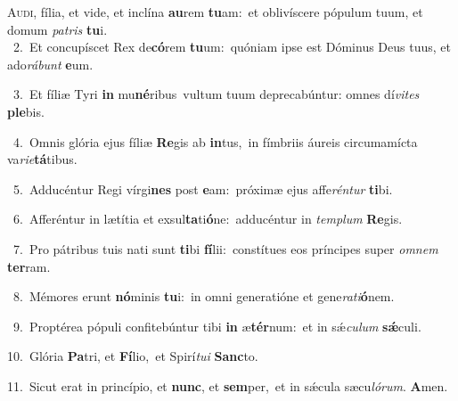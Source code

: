\lettrine{\initial\textcolor{\initialcolor}{A}}{udi,} fília, et vide, et inclína \textbf{au}\-rem \textbf{tu}\-am:~\star et oblivíscere pópulum tuum, et domum \textit{pa}\-\textit{tris} \textbf{tu}\-i.\\
{\numbfont\textcolor{\numbcolor}{~2.}}~Et concupíscet Rex de\-\textbf{có}\-rem \textbf{tu}\-um:~\star quóniam ipse est Dóminus Deus tuus, et ado\-\textit{rá}\-\textit{bunt} \textbf{e}\-um.\par
{\numbfont\textcolor{\numbcolor}{~3.}}~Et fíliæ Tyri \textbf{in} mu\-\textbf{né}\-ribus~\star vultum tuum deprecabúntur: omnes dí\-\textit{vi}\-\textit{tes} \textbf{ple}\-bis.\par
{\numbfont\textcolor{\numbcolor}{~4.}}~Omnis glória ejus fíliæ \textbf{Re}\-gis ab \textbf{in}\-tus,~\star in fímbriis áureis circumamícta va\-\textit{ri}\-\textit{e}\textbf{tá}tibus.\par
{\numbfont\textcolor{\numbcolor}{~5.}}~Adducéntur Regi vírgi\textbf{nes} post \textbf{e}\-am:~\star próximæ ejus affe\-\textit{rén}\-\textit{tur} \textbf{ti}\-bi.\par
{\numbfont\textcolor{\numbcolor}{~6.}}~Afferéntur in lætítia et exsul\-\textbf{ta}\-ti\-\textbf{ó}\-ne:~\star adducéntur in \textit{tem}\-\textit{plum} \textbf{Re}\-gis.\par
{\numbfont\textcolor{\numbcolor}{~7.}}~Pro pátribus tuis nati sunt \textbf{ti}\-bi \textbf{fí}\-lii:~\star constítues eos príncipes super \textit{om}\-\textit{nem} \textbf{ter}\-ram.\par
{\numbfont\textcolor{\numbcolor}{~8.}}~Mémores erunt \textbf{nó}\-minis \textbf{tu}\-i:~\star in omni generatióne et gene\-\textit{ra}\-\textit{ti}\textbf{ó}nem.\par
{\numbfont\textcolor{\numbcolor}{~9.}}~Proptérea pópuli confitebúntur tibi \textbf{in} æ\-\textbf{tér}\-num:~\star et in sǽ\-\textit{cu}\-\textit{lum} \textbf{sǽ}\-culi.\par
{\numbfont\textcolor{\numbcolor}{10.}}~Glória \textbf{Pa}\-tri, et \textbf{Fí}\-lio,~\star et Spirí\-\textit{tu}\-\textit{i} \textbf{Sanc}\-to.\par
{\numbfont\textcolor{\numbcolor}{11.}}~Sicut erat in princípio, et \textbf{nunc}\-, et \textbf{sem}\-per,~\star et in sǽcula sæcu\-\textit{ló}\-\textit{rum}. \textbf{A}\-men.\par

